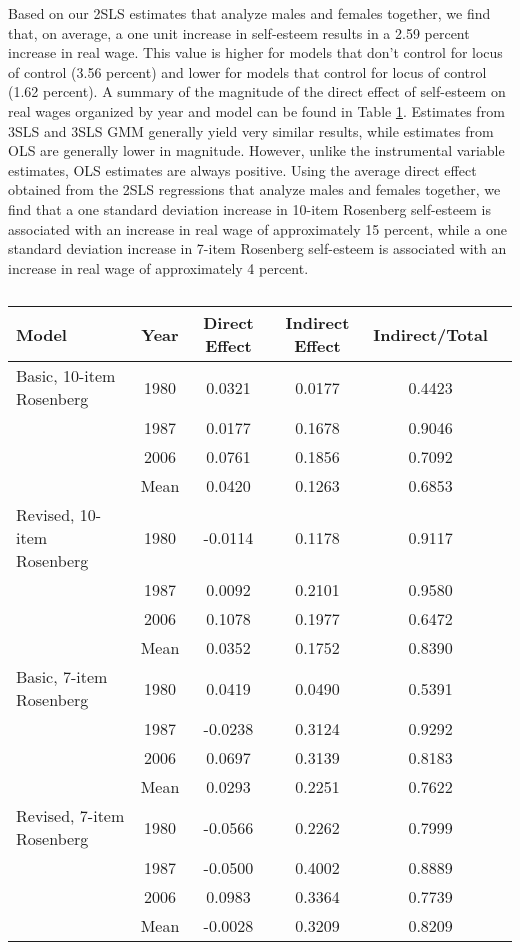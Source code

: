 \documentclass[12pt]{report}
\newcommand{\prbf}[1]{\textbf{#1}}
\begin{document}
Based on our 2SLS estimates that analyze males and females together, we find that, on average, a one unit increase in self-esteem results in a 2.59 percent increase in real wage. This value is higher for models that don't control for locus of control (3.56 percent) and lower for models that control for locus of control (1.62 percent). A summary of the magnitude of the direct effect of self-esteem on real wages organized by year and model can be found in Table \ref{tab:ind}. Estimates from 3SLS and 3SLS GMM generally yield very similar results, while estimates from OLS are generally lower in magnitude. However, unlike the instrumental variable estimates, OLS estimates are always positive. Using the average direct effect obtained from the 2SLS regressions that analyze males and females together, we find that a one standard deviation increase in 10-item Rosenberg self-esteem is associated with an increase in real wage of approximately 15 percent, while a one standard deviation increase in 7-item Rosenberg self-esteem is associated with an increase in real wage of approximately 4 percent.

\begin{table}
\caption{\label{tab:ind}}
\vspace{2pt}
\centering\begin{tabular}{l|c|c|c|cc}
\hline
\hline
\prbf{Model} & \prbf{Year} & \prbf{Direct Effect} & \prbf{Indirect Effect} & \prbf{Indirect/Total}\\
\hline
Basic, 10-item Rosenberg & 1980 & 0.0321 & 0.0177 & 0.4423\\
& 1987 & 0.0177 & 0.1678 & 0.9046\\
& 2006 & 0.0761 & 0.1856 & 0.7092\\
& Mean & 0.0420 & 0.1263 & 0.6853\\
\hline
Revised, 10-item Rosenberg & 1980 & -0.0114 & 0.1178 & 0.9117\\
& 1987 & 0.0092 & 0.2101 & 0.9580\\
& 2006 & 0.1078 & 0.1977 & 0.6472\\
& Mean & 0.0352 & 0.1752 & 0.8390\\
\hline
Basic, 7-item Rosenberg & 1980 & 0.0419 & 0.0490 & 0.5391\\
& 1987 & -0.0238 & 0.3124 & 0.9292\\
& 2006 & 0.0697 & 0.3139 & 0.8183\\
& Mean & 0.0293 & 0.2251 & 0.7622\\
\hline
Revised, 7-item Rosenberg & 1980 & -0.0566 & 0.2262 & 0.7999\\
& 1987 & -0.0500 & 0.4002 & 0.8889\\
& 2006 & 0.0983 & 0.3364 & 0.7739\\
& Mean & -0.0028 & 0.3209 & 0.8209\\
\hline
\hline
\end{tabular}
\end{table}
\end{document}

